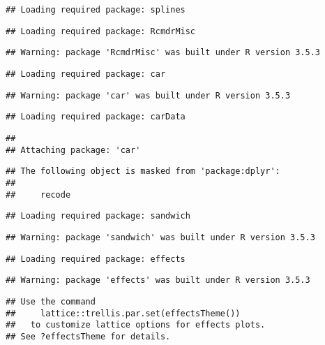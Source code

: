 \documentclass[]{article}
\begin{document}
\begin{verbatim}
## Loading required package: splines
\end{verbatim}

\begin{verbatim}
## Loading required package: RcmdrMisc
\end{verbatim}

\begin{verbatim}
## Warning: package 'RcmdrMisc' was built under R version 3.5.3
\end{verbatim}

\begin{verbatim}
## Loading required package: car
\end{verbatim}

\begin{verbatim}
## Warning: package 'car' was built under R version 3.5.3
\end{verbatim}

\begin{verbatim}
## Loading required package: carData
\end{verbatim}

\begin{verbatim}
## 
## Attaching package: 'car'
\end{verbatim}

\begin{verbatim}
## The following object is masked from 'package:dplyr':
## 
##     recode
\end{verbatim}

\begin{verbatim}
## Loading required package: sandwich
\end{verbatim}

\begin{verbatim}
## Warning: package 'sandwich' was built under R version 3.5.3
\end{verbatim}

\begin{verbatim}
## Loading required package: effects
\end{verbatim}

\begin{verbatim}
## Warning: package 'effects' was built under R version 3.5.3
\end{verbatim}

\begin{verbatim}
## Use the command
##     lattice::trellis.par.set(effectsTheme())
##   to customize lattice options for effects plots.
## See ?effectsTheme for details.
\end{verbatim}
\end{document}
